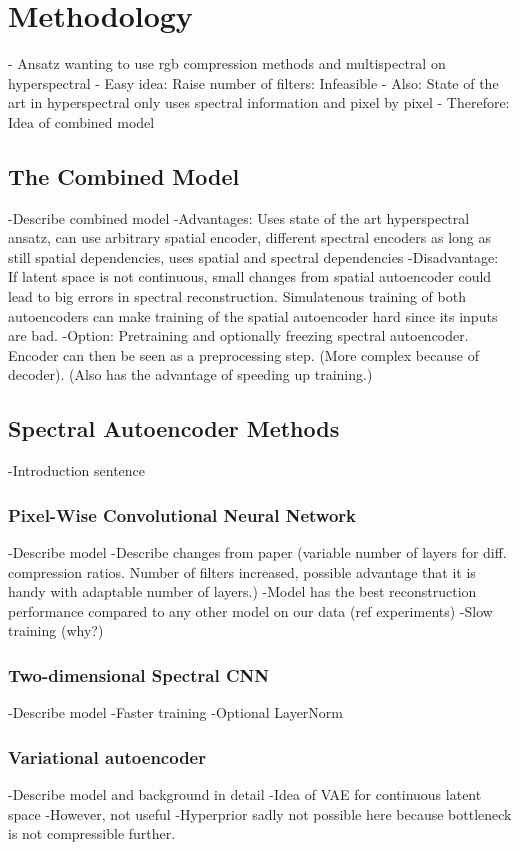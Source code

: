 \chapter{Methodology\label{cha:chapter4}}
- Ansatz wanting to use rgb compression methods and multispectral on hyperspectral
- Easy idea: Raise number of filters: Infeasible
- Also: State of the art in hyperspectral only uses spectral information and pixel by pixel
- Therefore: Idea of combined model
\section{The Combined Model}
-Describe combined model
-Advantages: Uses state of the art hyperspectral ansatz, can use arbitrary spatial encoder, different spectral encoders as long as still spatial dependencies, uses spatial and spectral dependencies
-Disadvantage: If latent space is not continuous, small changes from spatial autoencoder could lead to big errors in spectral reconstruction. Simulatenous training of both autoencoders can make training of the spatial autoencoder hard since its inputs are bad.
-Option: Pretraining and optionally freezing spectral autoencoder. Encoder can then be seen as a preprocessing step. (More complex because of decoder). (Also has the advantage of speeding up training.)

\section{Spectral Autoencoder Methods}
-Introduction sentence

\subsection{Pixel-Wise Convolutional Neural Network\label{sec:ch3xxx}}
-Describe model
-Describe changes from paper (variable number of layers for diff. compression ratios. Number of filters increased, possible advantage that it is handy with adaptable number of layers.)
-Model has the best reconstruction performance compared to any other model on our data (ref experiments)
-Slow training (why?)

\subsection{Two-dimensional Spectral CNN\label{sec:ch3yyy}}
-Describe model
-Faster training
-Optional LayerNorm


\subsection{Variational autoencoder \label{sec:ch3yyy}}
-Describe model and background in detail
-Idea of VAE for continuous latent space
-However, not useful
-Hyperprior sadly not possible here because bottleneck is not compressible further.


